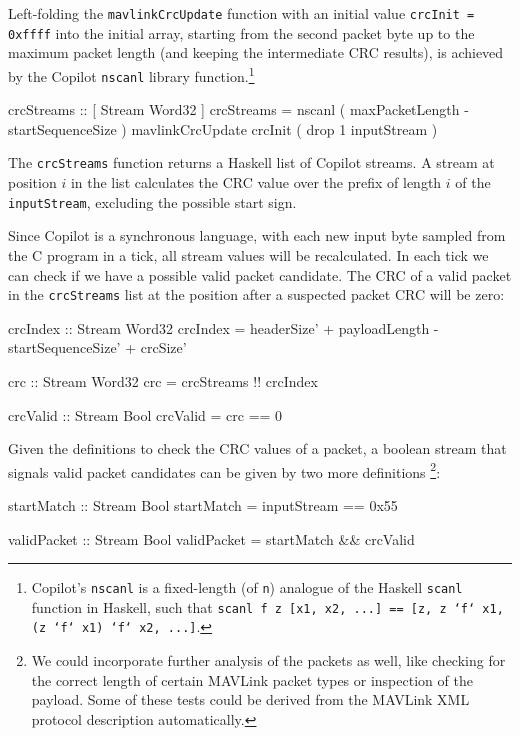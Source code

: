 Left-folding the {\tt mavlinkCrcUpdate} function with an initial value
{\tt crcInit = 0xffff} into the initial array, starting from the second
packet byte up to the maximum packet length (and keeping the intermediate
CRC results), is achieved by the Copilot {\tt nscanl} library
function.\footnote{Copilot's {\tt nscanl} is a fixed-length (of {\tt n}) analogue
  of the Haskell {\tt scanl} function in Haskell, such that
{\tt scanl f z [x1, x2, ...] == [z, z `f` x1, (z `f` x1) `f` x2,
    ...]}.}


\begin{code}
crcStreams :: [ Stream Word32 ]
crcStreams = nscanl
             ( maxPacketLength - startSequenceSize )
             mavlinkCrcUpdate crcInit
             ( drop 1 inputStream )
\end{code}

The {\tt crcStreams} function returns a Haskell list of Copilot
streams. A stream at position $i$ in the list calculates the CRC
value over the prefix of length $i$ of the {\tt inputStream}, excluding
the possible start sign.

Since Copilot is a synchronous language, with each new input byte
sampled from the C program in a tick, all stream values will be
recalculated. In each tick we can check if we have a possible valid
packet candidate. The CRC of a valid packet in the {\tt crcStreams}
list at the position after a suspected packet CRC will be zero:

\begin{code}
crcIndex :: Stream Word32
crcIndex = headerSize' + payloadLength
             - startSequenceSize' + crcSize'

crc :: Stream Word32
crc = crcStreams !! crcIndex

crcValid :: Stream Bool
crcValid = crc == 0
\end{code}


Given the definitions to check the CRC values of a packet, a boolean stream
that signals valid packet candidates can be given by two more definitions
\footnote{We could incorporate further analysis of the packets as
  well, like checking for the correct length of certain MAVLink packet
  types or inspection of the payload. Some of these tests could be
  derived from the MAVLink XML protocol description automatically.}:

\begin{code}
startMatch :: Stream Bool
startMatch  = inputStream == 0x55

validPacket :: Stream Bool
validPacket = startMatch && crcValid
\end{code}


